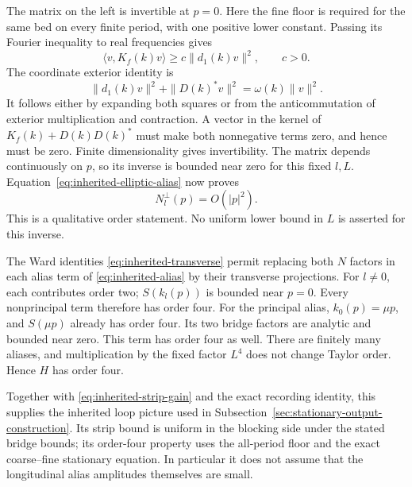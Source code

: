 The matrix on the left is invertible at $p=0$. Here the fine
floor is required for the same bed on every finite period, with
one positive lower constant. Passing its Fourier inequality to
real frequencies gives
\[
       \langle v,K_f(k)v\rangle\ge c\|d_1(k)v\|^2,
                                  \qquad c>0.
\]
The coordinate exterior identity is
\[
        \|d_1(k)v\|^2+\|D(k)^*v\|^2=\omega(k)\|v\|^2.
\]
It follows either by expanding both squares or from the
anticommutation of exterior multiplication and contraction.
A vector in the kernel of $K_f(k)+D(k)D(k)^*$ must make both
nonnegative terms zero, and hence must be zero. Finite
dimensionality gives invertibility. The matrix depends
continuously on $p$, so its inverse is bounded near zero for
this fixed $l,L$. Equation~\eqref{eq:inherited-elliptic-alias}
now proves
\[
                              N_l^{\perp}(p)=O(|p|^2).
\]
This is a qualitative order statement. No uniform lower bound
in $L$ is asserted for this inverse.

The Ward identities \eqref{eq:inherited-transverse} permit
replacing both $N$ factors in each alias term of
\eqref{eq:inherited-alias} by their transverse projections.
For $l\ne0$, each contributes order two; $S(k_l(p))$ is bounded
near $p=0$. Every nonprincipal term therefore has order four.
For the principal alias, $k_0(p)=\mu p$, and $S(\mu p)$ already
has order four. Its two bridge factors are analytic and bounded
near zero. This term has order four as well. There are finitely
many aliases, and multiplication by the fixed factor $L^4$
does not change Taylor order. Hence $H$ has order four.

Together with \eqref{eq:inherited-strip-gain} and the exact
recording identity, this supplies the inherited loop picture
used in Subsection~\ref{sec:stationary-output-construction}.
Its strip bound is uniform in the blocking side under the stated
bridge bounds; its order-four property uses the all-period floor
and the exact coarse--fine stationary equation. In particular it
does not assume that the longitudinal alias amplitudes themselves
are small.

